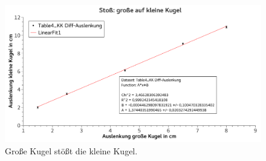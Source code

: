 \documentclass[
	a4paper,
	12pt,
	pagesize,
	ngerman
]{scrartcl}
\begin{document}
	\begin{figure}[htb]
	  \centering
	    \includegraphics[width=1.0\textwidth]{StossGKaufKK} %
	  \caption{Große Kugel stößt die kleine Kugel.}
		\label{GraphGKaufKK}
	\end{figure}
\end{document}

